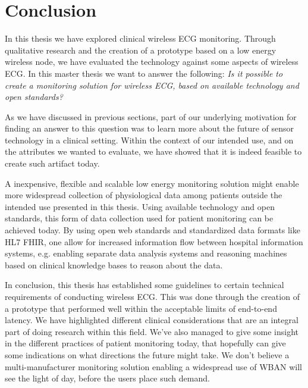 \section{Conclusion} %
\label{sec:conclusion}

In this thesis we have explored clinical wireless ECG monitoring. Through qualitative research and the creation of a prototype based on a low energy wireless node, we have evaluated the technology against some aspects of wireless ECG. In this master thesis we want to answer the following: \textit{Is it possible to create a monitoring solution for wireless ECG, based on available technology and open standards?}

As we have discussed in previous sections, part of our underlying motivation for finding an answer to this question was to learn more about the future of sensor technology in a clinical setting. Within the context of our intended use, and on the attributes we wanted to evaluate, we have showed that it is indeed feasible to create such artifact today.

A inexpensive, flexible and scalable low energy monitoring solution might enable more widespread collection of physiological data among patients outside the intended use presented in this thesis. Using available technology and open standards, this form of data collection used for patient monitoring can be achieved today. By using open web standards and standardized data formats like HL7 FHIR, one allow for increased information flow between hospital information systems, e.g. enabling separate data analysis systems and reasoning machines based on clinical knowledge bases to reason about the data.

In conclusion, this thesis has established some guidelines to certain technical requirements of conducting wireless ECG. This was done through the creation of a prototype that performed well within the acceptable limits of end-to-end latency. We have highlighted different clinical considerations that are an integral part of doing research within this field. We've also managed to give some insight in the different practices of patient monitoring today, that hopefully can give some indications on what directions the future might take. We don't believe a multi-manufacturer monitoring solution enabling a widespread use of WBAN will see the light of day, before the users place such demand.

